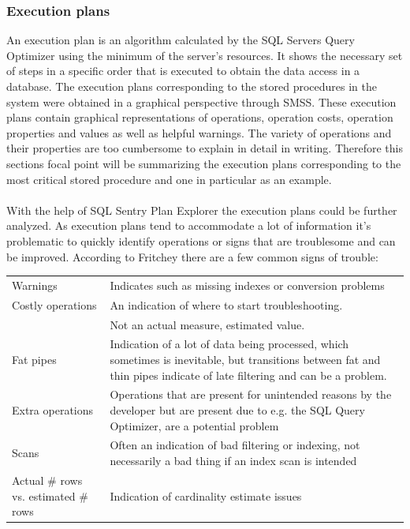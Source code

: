 \documentclass{cslthse-msc}
\begin{document}
\subsubsection{Execution plans}
An execution plan is an algorithm calculated by the SQL Servers Query Optimizer using the minimum of the server's resources. It shows the necessary set of steps in a specific order that is executed to obtain the data access in a database. The execution plans corresponding to the stored procedures in the system were obtained in a graphical perspective through SMSS. These execution plans contain graphical representations of operations, operation costs, operation properties and values as well as helpful warnings. The variety of operations and their properties are too cumbersome to explain in detail in writing. Therefore this sections focal point will be summarizing the execution plans corresponding to the most critical stored procedure and one in particular as an example.\\\\      
With the help of SQL Sentry Plan Explorer the execution plans could be further analyzed. As execution plans tend to accommodate a lot of information it's problematic to quickly identify operations or signs that are troublesome and can be improved. According to Fritchey \cite{fritchey2} there are a few common signs of trouble:
\begin{table}[H]
\begin{center}
\begin{tabular}{p{3cm} p{10cm}}
Warnings & Indicates such as missing indexes or conversion problems\\
Costly operations & An indication of where to start troubleshooting.\\ & Not an actual measure, estimated value.\\
Fat pipes & Indication of a lot of data being processed, which sometimes is inevitable, but transitions between fat and thin pipes indicate of late filtering and can be a problem.\\
Extra operations & Operations that are present for unintended reasons by the developer but are present due to e.g. the SQL Query Optimizer, are a potential problem\\
Scans & Often an indication of bad filtering or indexing, not necessarily a bad thing if an index scan is intended\\
Actual \# rows vs. estimated \# rows & Indication of cardinality estimate issues\\
\end{tabular}
\end{center}
\end{table}
 
\end{document}
